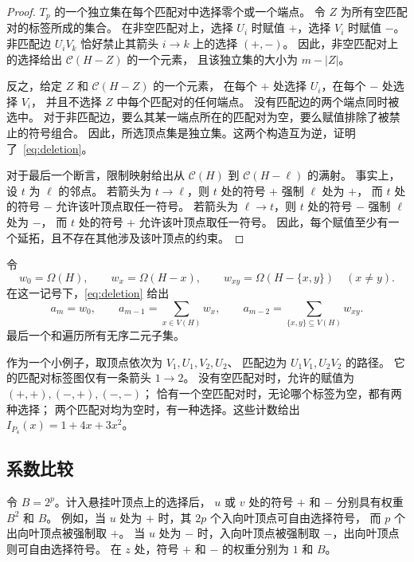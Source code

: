 \documentclass[UTF8,11pt,a4paper,fontset=fandol]{ctexart}
\theoremstyle{remark}
\numberwithin{equation}{section}
\begin{document}
\begin{proof}
$T_p$ 的一个独立集在每个匹配对中选择零个或一个端点。
令 $Z$ 为所有空匹配对的标签所成的集合。
在非空匹配对上，选择 $U_i$ 时赋值 $+$，选择 $V_i$ 时赋值 $-$。
非匹配边 $U_iV_k$ 恰好禁止其箭头 $i\to k$ 上的选择 $(+,-)$。
因此，非空匹配对上的选择给出 $\mathcal C(H-Z)$ 的一个元素，
且该独立集的大小为 $m-|Z|$。

反之，给定 $Z$ 和 $\mathcal C(H-Z)$ 的一个元素，
在每个 $+$ 处选择 $U_i$，在每个 $-$ 处选择 $V_i$，
并且不选择 $Z$ 中每个匹配对的任何端点。
没有匹配边的两个端点同时被选中。
对于非匹配边，要么其某一端点所在的匹配对为空，要么赋值排除了被禁止的符号组合。
因此，所选顶点集是独立集。这两个构造互为逆，证明了~\eqref{eq:deletion}。

对于最后一个断言，限制映射给出从 $\mathcal C(H)$ 到 $\mathcal C(H-\ell)$ 的满射。
事实上，设 $t$ 为 $\ell$ 的邻点。
若箭头为 $t\to\ell$，则 $t$ 处的符号 $+$ 强制 $\ell$ 处为 $+$，
而 $t$ 处的符号 $-$ 允许该叶顶点取任一符号。
若箭头为 $\ell\to t$，则 $t$ 处的符号 $-$ 强制 $\ell$ 处为 $-$，
而 $t$ 处的符号 $+$ 允许该叶顶点取任一符号。
因此，每个赋值至少有一个延拓，且不存在其他涉及该叶顶点的约束。
\end{proof}

令
\[
 w_0=\Omega(H),\qquad w_x=\Omega(H-x),\qquad
 w_{xy}=\Omega(H-\{x,y\})\quad(x\ne y).
\]
在这一记号下，\eqref{eq:deletion} 给出
\begin{equation}
 a_m=w_0,\qquad
 a_{m-1}=\sum_{x\in V(H)}w_x,\qquad
 a_{m-2}=\sum_{\{x,y\}\subseteq V(H)}w_{xy}.
 \label{eq:topthree}
\end{equation}
最后一个和遍历所有无序二元子集。

作为一个小例子，取顶点依次为 $V_1,U_1,V_2,U_2$、
匹配边为 $U_1V_1,U_2V_2$ 的路径。
它的匹配对标签图仅有一条箭头 $1\to2$。
没有空匹配对时，允许的赋值为 $(+,+),(-,+),(-,-)$；
恰有一个空匹配对时，无论哪个标签为空，都有两种选择；
两个匹配对均为空时，有一种选择。这些计数给出 $I_{P_4}(x)=1+4x+3x^2$。

\subsection{系数比较}\label{sec:comparison}

令 $B=2^p$。计入悬挂叶顶点上的选择后，
$u$ 或 $v$ 处的符号 $+$ 和 $-$ 分别具有权重 $B^2$ 和 $B$。
例如，当 $u$ 处为 $+$ 时，其 $2p$ 个入向叶顶点可自由选择符号，
而 $p$ 个出向叶顶点被强制取 $+$。
当 $u$ 处为 $-$ 时，入向叶顶点被强制取 $-$，出向叶顶点则可自由选择符号。
在 $z$ 处，符号 $+$ 和 $-$ 的权重分别为 $1$ 和 $B$。
\end{document}
